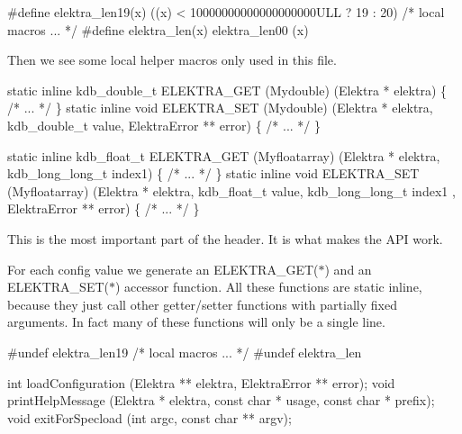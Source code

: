 \begin{DoxyCode}
\textcolor{preprocessor}{#define elektra\_len19(x) ((x) < 10000000000000000000ULL ? 19 : 20)}
\textcolor{comment}{/* local macros ... */}
\textcolor{preprocessor}{#define elektra\_len(x) elektra\_len00 (x)}
\end{DoxyCode}


Then we see some local helper macros only used in this file.


\begin{DoxyCode}
\textcolor{keyword}{static} \textcolor{keyword}{inline} kdb\_double\_t ELEKTRA\_GET (Mydouble) (Elektra * elektra) \{ \textcolor{comment}{/* ... */} \}
\textcolor{keyword}{static} \textcolor{keyword}{inline} \textcolor{keywordtype}{void} ELEKTRA\_SET (Mydouble) (Elektra * elektra, kdb\_double\_t value, ElektraError ** error) \{ \textcolor{comment}{
      /* ... */} \}

\textcolor{keyword}{static} \textcolor{keyword}{inline} kdb\_float\_t ELEKTRA\_GET (Myfloatarray) (Elektra * elektra, kdb\_long\_long\_t index1) \{  \textcolor{comment}{/* ... 
      */} \}
\textcolor{keyword}{static} \textcolor{keyword}{inline} \textcolor{keywordtype}{void} ELEKTRA\_SET (Myfloatarray) (Elektra * elektra, kdb\_float\_t value, kdb\_long\_long\_t index1
      , ElektraError ** error) \{ \textcolor{comment}{/* ... */} \}
\end{DoxyCode}


This is the most important part of the header. It is what makes the A\+PI work.

For each config value we generate an {\ttfamily E\+L\+E\+K\+T\+R\+A\+\_\+\+G\+E\+T($\ast$)} and an {\ttfamily E\+L\+E\+K\+T\+R\+A\+\_\+\+S\+E\+T($\ast$)} accessor function. All these functions are {\ttfamily static inline}, because they just call other getter/setter functions with partially fixed arguments. In fact many of these functions will only be a single line.


\begin{DoxyCode}
\textcolor{preprocessor}{#undef elektra\_len19}
\textcolor{comment}{/* local macros ... */}
\textcolor{preprocessor}{#undef elektra\_len}

\textcolor{keywordtype}{int} loadConfiguration (Elektra ** elektra, ElektraError ** error);
\textcolor{keywordtype}{void} printHelpMessage (Elektra * elektra, \textcolor{keyword}{const} \textcolor{keywordtype}{char} * usage, \textcolor{keyword}{const} \textcolor{keywordtype}{char} * prefix);
\textcolor{keywordtype}{void} exitForSpecload (\textcolor{keywordtype}{int} argc, \textcolor{keyword}{const} \textcolor{keywordtype}{char} ** argv);
\end{DoxyCode}


